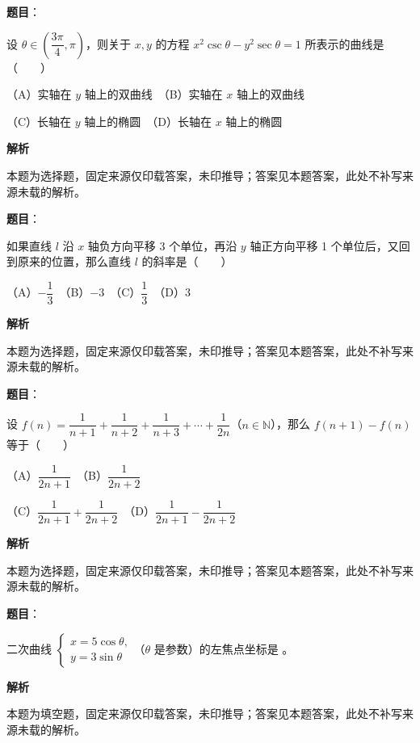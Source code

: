 \begin{answer}

\textbf{题目}：

设 $\theta\in\left(\dfrac{3\pi}{4},\pi\right)$，则关于 $x,y$ 的方程 $x^2\csc\theta-y^2\sec\theta=1$ 所表示的曲线是\mbox{（　　）}

（A）实轴在 $y$ 轴上的双曲线　（B）实轴在 $x$ 轴上的双曲线

（C）长轴在 $y$ 轴上的椭圆　（D）长轴在 $x$ 轴上的椭圆

\textbf{解析}

本题为选择题，固定来源仅印载答案，未印推导；答案见本题答案，此处不补写来源未载的解析。


\end{answer}
\begin{answer}

\textbf{题目}：

如果直线 $l$ 沿 $x$ 轴负方向平移 3 个单位，再沿 $y$ 轴正方向平移 1 个单位后，又回到原来的位置，那么直线 $l$ 的斜率是\mbox{（　　）}

（A）$-\dfrac13$　（B）$-3$　（C）$\dfrac13$　（D）$3$

\textbf{解析}

本题为选择题，固定来源仅印载答案，未印推导；答案见本题答案，此处不补写来源未载的解析。


\end{answer}
\begin{answer}

\textbf{题目}：

设 $f(n)=\dfrac1{n+1}+\dfrac1{n+2}+\dfrac1{n+3}+\cdots+\dfrac1{2n}$（$n\in\mathbb N$），那么 $f(n+1)-f(n)$ 等于\mbox{（　　）}

（A）$\dfrac1{2n+1}$　（B）$\dfrac1{2n+2}$

（C）$\dfrac1{2n+1}+\dfrac1{2n+2}$　（D）$\dfrac1{2n+1}-\dfrac1{2n+2}$

\textbf{解析}

本题为选择题，固定来源仅印载答案，未印推导；答案见本题答案，此处不补写来源未载的解析。


\end{answer}
\begin{answer}

\textbf{题目}：

二次曲线 $\begin{cases}x=5\cos\theta,\\ y=3\sin\theta\end{cases}$（$\theta$ 是参数）的左焦点坐标是 \gkblank{}。

\textbf{解析}

本题为填空题，固定来源仅印载答案，未印推导；答案见本题答案，此处不补写来源未载的解析。


\end{answer}
